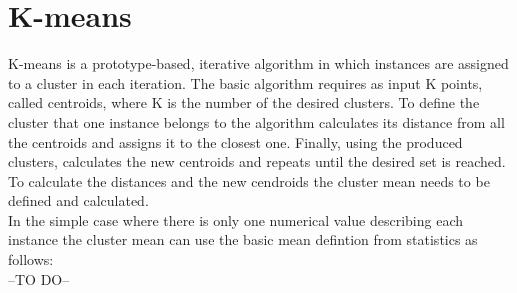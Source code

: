 \section{K-means}
K-means is a prototype-based, iterative algorithm in which instances are assigned to a cluster in each iteration.  The basic algorithm requires as input K points, called centroids, where K is the number of the desired clusters. To define the cluster that one instance belongs to the algorithm calculates  its distance from all the centroids and assigns it to the closest one. Finally, using the produced clusters, calculates the new centroids and repeats until the desired set is reached. To calculate the distances and the new cendroids the cluster mean needs to be defined and calculated. \autocite{dunham, tanSteinKum} \\
In the simple case where there is only one numerical value describing each instance the cluster mean can use the basic mean defintion from statistics as follows: \\
--TO DO--


 